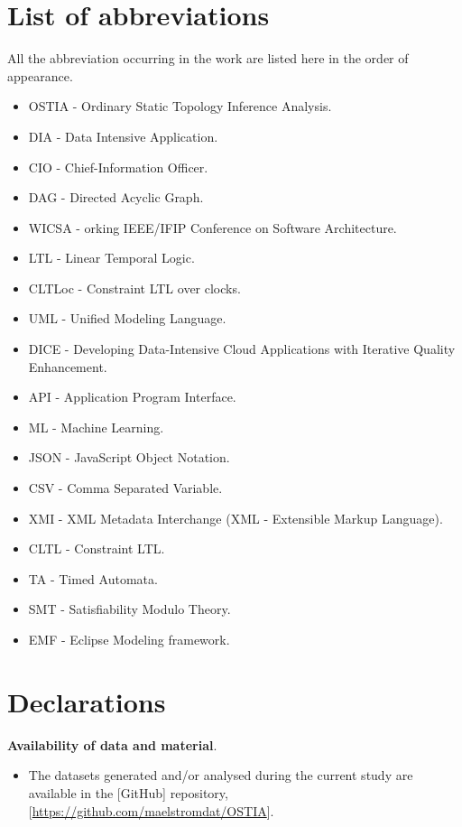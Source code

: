 \documentclass[smallextended]{svjour3}       %
\begin{document}

\section{List of abbreviations}
All the abbreviation occurring in the work are listed here in the order of appearance.
\begin{itemize}
	\item OSTIA - Ordinary Static Topology Inference Analysis.
	\item DIA - Data Intensive Application.
	\item CIO - Chief-Information Officer.
	\item DAG - Directed Acyclic Graph.
	\item WICSA - orking IEEE/IFIP Conference on Software Architecture.
	\item LTL - Linear Temporal Logic.
	\item CLTLoc - Constraint LTL over clocks.
	\item UML - Unified Modeling Language.
	\item DICE - Developing Data-Intensive Cloud Applications with Iterative Quality Enhancement.
	\item API - Application Program Interface.
	\item ML - Machine Learning.
	\item JSON - JavaScript Object Notation.
	\item CSV - Comma Separated Variable.
	\item XMI - XML Metadata Interchange (XML - Extensible Markup Language).
	\item CLTL - Constraint LTL.
	\item TA - Timed Automata.
	\item SMT - Satisfiability Modulo Theory.
	\item EMF - Eclipse Modeling framework.
\end{itemize}


\section{Declarations}
\textbf{Availability of data and material}. 
\begin{itemize}
	\item The datasets generated and/or analysed during the current study are available in the [GitHub] repository, [\url{https://github.com/maelstromdat/OSTIA}].
\end{itemize}
\end{document}

